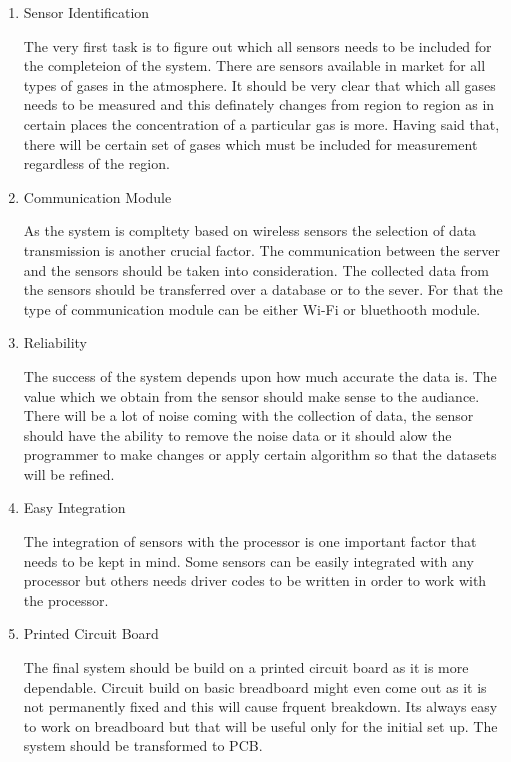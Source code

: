 \documentclass[11pt]{article}
\begin{document}
\begin {enumerate}

\item{Sensor Identification}

The very first task is to figure out which all sensors needs to be included for the completeion of the system. There are sensors available in market for all types of gases in the atmosphere. It should be very clear that which all gases needs to be measured and this definately changes from region to region as in certain places the concentration of a particular gas is more. Having said that, there will be certain set of gases which must be included for measurement regardless of the region.

\item{Communication Module}

As the system is compltety based on wireless sensors the selection of data transmission is another crucial factor. The communication between the server and the sensors should be taken into consideration.
The collected data from the sensors should be transferred over a database or to the sever. For that the type of communication module can be either Wi-Fi or bluethooth module.

\item {Reliability}

The success of the system depends upon how much accurate the data is. The value which we obtain from the sensor should make sense to the audiance. There will be a lot of noise coming with the  collection of data, the sensor should have the ability to remove the noise data or it should alow the programmer to make changes or apply certain algorithm so that the datasets will be refined.


\item {Easy Integration}

The integration of sensors with the processor is one important factor that needs to be kept in mind. Some sensors can be easily integrated with any processor but others needs driver codes to be written in order to work with the processor.

\item {Printed Circuit Board}

The final system should be build on a printed circuit board as it is more dependable. Circuit build on basic breadboard might even come out as it is not permanently fixed and this will cause frquent breakdown. Its always easy to work on breadboard but that will be useful only for the initial set up. The system should be transformed to PCB.



\end{enumerate}
\end{document}
